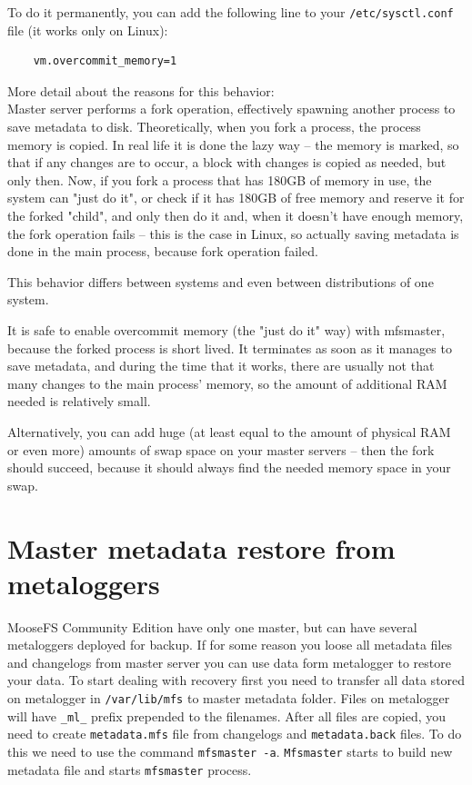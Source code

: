 \documentclass[a4paper,11pt,english]{report}
\def\code#1{\texttt{#1}}
\begin{document}
		To do it permanently, you can add the following line to your \code{/etc/sysctl.conf} file (it works only on Linux):

		\begin{lstlisting}
	vm.overcommit_memory=1
		\end{lstlisting}

		More detail about the reasons for this behavior:\\
		Master server performs a fork operation, effectively spawning another process to save metadata to disk. Theoretically, when you fork a process, the process memory is copied. In real life it is done the lazy way -- the memory is marked, so that if any changes are to occur, a block with changes is copied as needed, but only then. Now, if you fork a process that has 180GB of memory in use, the system can "just do it", or check if it has 180GB of free memory and reserve it for the forked "child", and only then do it and, when it doesn't have enough memory, the fork operation fails -- this is the case in Linux, so actually saving metadata is done in the main process, because fork operation failed.

		This behavior differs between systems and even between distributions of one system.

		It is safe to enable overcommit memory (the "just do it" way) with mfsmaster, because the forked process is short lived. It terminates as soon as it manages to save metadata, and during the time that it works, there are usually not that many changes to the main process' memory, so the amount of additional RAM needed is relatively small.

		Alternatively, you can add huge (at least equal to the amount of physical RAM or even more) amounts of swap space on your master servers -- then the fork should succeed, because it should always find the needed memory space in your swap.
		
		\section{Master metadata restore from metaloggers}
		MooseFS Community Edition have only one master, but can have several metaloggers deployed for backup. If for some reason you loose all metadata files and changelogs from master server you can use data form metalogger to restore your data. To start dealing with recovery first you need to transfer all data stored on metalogger in \code{/var/lib/mfs} to master metadata folder. Files on metalogger will have \code{\_ml\_} prefix prepended to the filenames. After all files are copied, you need to create \code{metadata.mfs} file from changelogs and \code{metadata.back} files. To do this we need to use the command \code{mfsmaster -a}. \code{Mfsmaster} starts to build new metadata file and starts \code{mfsmaster} process.
		
\end{document}
